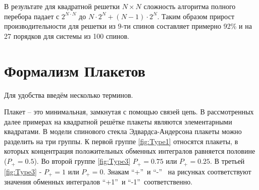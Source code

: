 \documentclass[utf8, babel, sor, jor, amsmath, amssymb, reprint]{elsarticle} %
\begin{document}
В результате для квадратной решетки $N \times N$ сложность алгоритма полного перебора падает с $2^{N \cdot N}$ до $N \cdot 2^N + (N - 1) \cdot 2^N$. Таким образом прирост производительности для решетки из 9-ти спинов составляет примерно 92\% и на 27 порядков для системы из 100 спинов.


\section{Формализм Плакетов}

Для удобства введём несколько терминов.

 Плакет – это минимальная, замкнутая с помощью связей цепь. В рассмотренных далее примерах на квадратной решётке плакеты являются элементарными квадратами. В модели спинового стекла Эдвардса-Андерсона плакеты можно разделить на три группы. К первой группе \ref{fig:Type1} относятся плакеты, в которых концентрация положительных обменных интегралов равняется половине ($P_+=0.5$). Во второй группе \ref{fig:Type3} $P_+=0.75$ или $P_+=0.25$. В третьей \ref{fig:Type3} - $P_+=1$ или $P_+=0$. Знакам \textquotedblleft +\textquotedblright ~и   \textquotedblleft -\textquotedblright ~ на рисунках соответствуют значения обменных интегралов  \textquotedblleft +1\textquotedblright ~и \textquotedblleft -1\textquotedblright ~соответственно.
 
\end{document}
